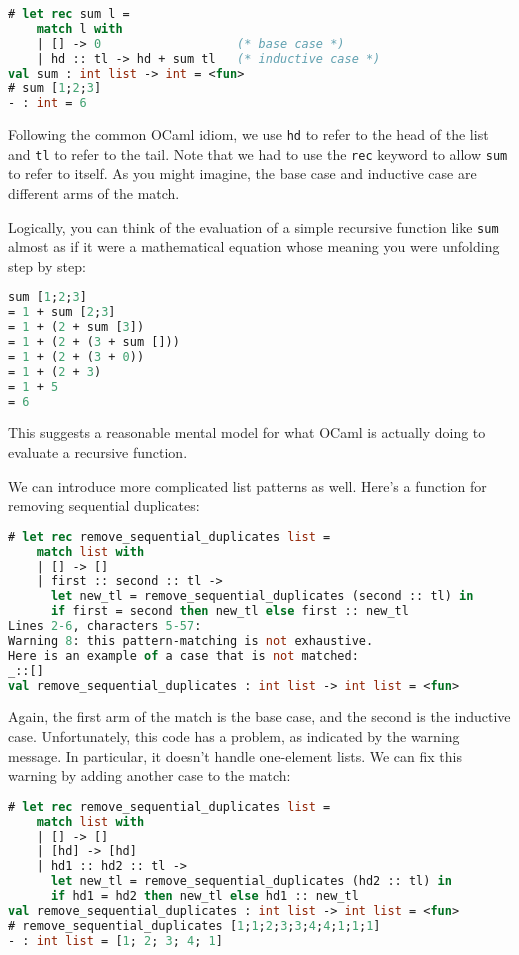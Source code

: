 \begin{lstlisting}[language=Caml]
# let rec sum l =
    match l with
    | [] -> 0                   (* base case *)
    | hd :: tl -> hd + sum tl   (* inductive case *)
val sum : int list -> int = <fun>
# sum [1;2;3]
- : int = 6
\end{lstlisting}

Following the common OCaml idiom, we use \passthrough{\lstinline!hd!} to
refer to the head of the list and \passthrough{\lstinline!tl!} to refer
to the tail. Note that we had to use the \passthrough{\lstinline!rec!}
keyword to allow \passthrough{\lstinline!sum!} to refer to itself. As
you might imagine, the base case and inductive case are different arms
of the match.

Logically, you can think of the evaluation of a simple recursive
function like \passthrough{\lstinline!sum!} almost as if it were a
mathematical equation whose meaning you were unfolding step by step:

\begin{lstlisting}[language=Caml]
sum [1;2;3]
= 1 + sum [2;3]
= 1 + (2 + sum [3])
= 1 + (2 + (3 + sum []))
= 1 + (2 + (3 + 0))
= 1 + (2 + 3)
= 1 + 5
= 6
\end{lstlisting}

This suggests a reasonable mental model for what OCaml is actually doing
to evaluate a recursive function.

We can introduce more complicated list patterns as well. Here's a
function for removing sequential duplicates:

\begin{lstlisting}[language=Caml]
# let rec remove_sequential_duplicates list =
    match list with
    | [] -> []
    | first :: second :: tl ->
      let new_tl = remove_sequential_duplicates (second :: tl) in
      if first = second then new_tl else first :: new_tl
Lines 2-6, characters 5-57:
Warning 8: this pattern-matching is not exhaustive.
Here is an example of a case that is not matched:
_::[]
val remove_sequential_duplicates : int list -> int list = <fun>
\end{lstlisting}

Again, the first arm of the match is the base case, and the second is
the inductive case. Unfortunately, this code has a problem, as indicated
by the warning message. In particular, it doesn't handle one-element
lists. We can fix this warning by adding another case to the match:

\begin{lstlisting}[language=Caml]
# let rec remove_sequential_duplicates list =
    match list with
    | [] -> []
    | [hd] -> [hd]
    | hd1 :: hd2 :: tl ->
      let new_tl = remove_sequential_duplicates (hd2 :: tl) in
      if hd1 = hd2 then new_tl else hd1 :: new_tl
val remove_sequential_duplicates : int list -> int list = <fun>
# remove_sequential_duplicates [1;1;2;3;3;4;4;1;1;1]
- : int list = [1; 2; 3; 4; 1]
\end{lstlisting}

